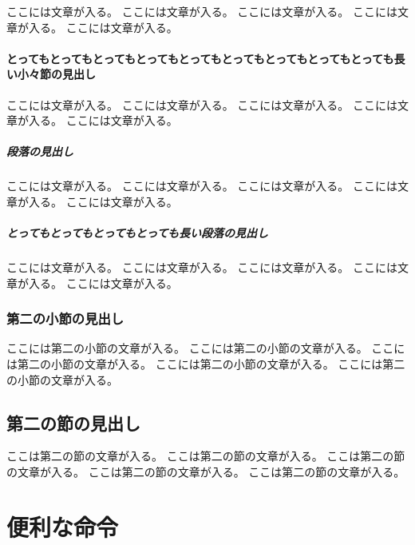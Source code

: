 \documentclass[ %
	uplatex,%
	a5paper,%
	papersize%
	]{jsbook}
\begin{document}
						ここには文章が入る。
						ここには文章が入る。
						ここには文章が入る。
						ここには文章が入る。
						ここには文章が入る。

						\subsubsection{とってもとってもとってもとってもとってもとってもとってもとってもとっても長い小々節の見出し}

						ここには文章が入る。
						ここには文章が入る。
						ここには文章が入る。
						ここには文章が入る。
						ここには文章が入る。

						\paragraph{段落の見出し}

						ここには文章が入る。
						ここには文章が入る。
						ここには文章が入る。
						ここには文章が入る。
						ここには文章が入る。

						\paragraph{とってもとってもとってもとっても長い段落の見出し}

						ここには文章が入る。
						ここには文章が入る。
						ここには文章が入る。
						ここには文章が入る。
						ここには文章が入る。

						\subsection{第二の小節の見出し}

						ここには第二の小節の文章が入る。
						ここには第二の小節の文章が入る。
						ここには第二の小節の文章が入る。
						ここには第二の小節の文章が入る。
						ここには第二の小節の文章が入る。

						\section{第二の節の見出し}

						ここは第二の節の文章が入る。
						ここは第二の節の文章が入る。
						ここは第二の節の文章が入る。
						ここは第二の節の文章が入る。
						ここは第二の節の文章が入る。

						\chapter{便利な命令}
\end{document}
